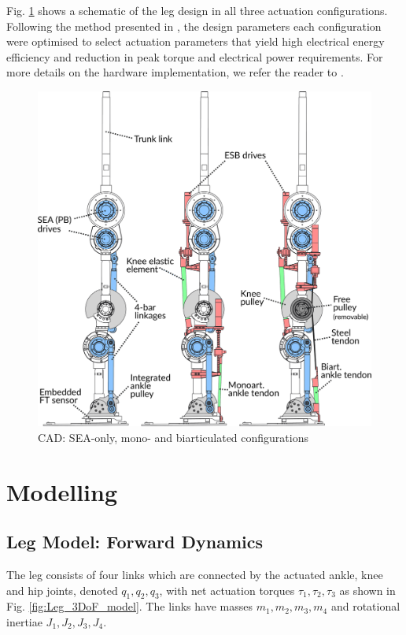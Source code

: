 \documentclass[letterpaper, 10 pt, conference]{ieeeconf}  %
\begin{document}
	Fig. \ref{fig:configurations} shows a schematic of the leg design in all three actuation configurations. Following the method presented in \cite{roozing2016design}, the design parameters each configuration were optimised to select actuation parameters that yield high electrical energy efficiency and reduction in peak torque and electrical power requirements. For more details on the hardware implementation, we refer the reader to \cite{roozing_design_2018}.
	
	\begin{figure}[ht]
		\centering
		\includegraphics[width=0.98\linewidth]{cad}
		\caption{CAD: SEA-only, mono- and biarticulated configurations}
		\label{fig:configurations}
	\end{figure}
	
	
	\section{Modelling} 
	\label{sec:modelling}
	
	\subsection{Leg Model: Forward Dynamics} 
	The leg consists of four links which are connected by the actuated ankle, knee and hip joints, denoted $q_1,q_2,q_3$, with net actuation torques $\tau_1,\tau_2,\tau_3$ as shown in Fig. \ref{fig:Leg_3DoF_model}. The links have masses $m_1,m_2,m_3,m_4$ and rotational inertiae $J_1,J_2,J_3,J_4$.
	
\end{document}
